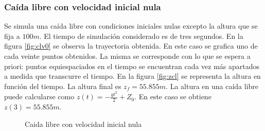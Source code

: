\documentclass[main]{subfiles}
\begin{document}
\subsubsection{Ca\'ida libre con velocidad inicial nula}

Se simula una ca\'ida libre con condiciones iniciales nulas excepto la altura que se fija a $100m$. El tiempo de simulaci\'on considerado es de tres segundos. En la figura \ref{fig:clv0} se observa la trayectoria obtenida. En este caso se grafica uno de cada veinte puntos obtenidos. La misma se corresponde con lo que se espera a priori: puntos equiespaciados en el tiempo se encuentran cada vez m\'as apartados a medida que transcurre el tiempo. En la figura \ref{fig:zcl} se representa la altura en funci\'on del tiempo. La altura final es $z_f=55.855m$. La altura en una ca\'ida libre puede calcularse como $z(t)=-\frac{gt^2}{2}+Z_0$. En este caso se obtiene $z(3)=55.855m$.



\begin{figure} [h!]
  \centering
 
  \caption{Caida libre con velocidad inicial nula}
  \label{fig:caida_libre}
\end{figure}
\end{document}
